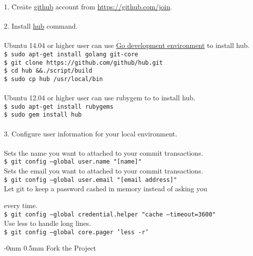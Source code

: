 \documentclass[10pt,landscape]{article}
\makeatletter
\renewcommand{\section}{\@startsection{section}{1}{0mm}%
                                {-0mm} %
                                {0.5mm}%
                                {\normalfont\large\bfseries}}
\makeatother
\begin{document}
\begin{multicols}{2}
\begin{tabbing}
1. \= Cre\=ate \href{http://github.com}{github} account from
\href{https://github.com/join}{https://github.com/join}.\\
\\
2. Install \href{https://github.com/github/hub}{hub} command.\\
\\
\> Ubuntu 14.04 or higher user can use \href{http://golang.org/doc/install}{Go development
  environment} to install hub.\\
\>\> \texttt{\$ sudo apt-get install golang git-core}\\
\>\> \texttt{\$ git clone https://github.com/github/hub.git}\\
\>\> \texttt{\$ cd hub \&\&./script/build}\\
\>\> \texttt{\$ sudo cp hub /usr/local/bin}\\
\\
\> Ubuntu 12.04 or higher user can use rubygem to to install hub.\\
\>\> \texttt{\$ sudo apt-get install rubygems}\\
\>\> \texttt{\$ sudo gem install hub}\\
\\

3. Configure user information for your local environment.\\
\\
\> Sets the name you want to attached to your commit transactions.\\
\>\> \texttt{\$ git config --global user.name "[name]"}\\
\>Sets the email you want to attached to your commit transactions.\\
\>\> \texttt{\$ git config --global user.email "[email address]"}\\
\>Let git to keep a password cashed in memory instead of asking you

every time.\\
\>\> \texttt{\$ git config --global credential.helper "cache --timeout=3600"}\\
\>Use less to handle long lines.\\
\>\> \texttt{\$ git config --global core.pager 'less -r'}\\

\end{tabbing}

\section{Fork the Project}
\vspace{2.5mm}


\end{multicols}
\end{document}
